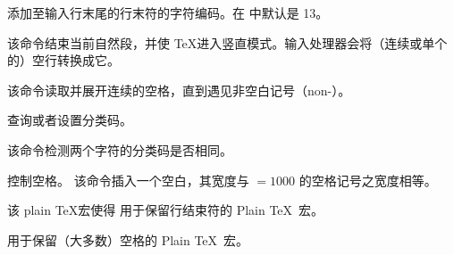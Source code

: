 \documentclass{book}
\begin{document}
\label{cschap:endlinechar}\label{cschap:ignorespaces}\label{cschap:catcode}
\label{cschap:char32}\label{cschap:obeylines}\label{cschap:obeyspaces}
\begin{inventory}
\item [\cs{endlinechar}]
      添加至输入行末尾的行末符的字符编码。在 \IniTeX 中默认是 13。
\item [\cs{par}]
      该命令结束当前自然段，并使 \TeX 进入竖直模式。输入处理器会将（连续或单个的）空行转换成它。

\item [\cs{ignorespaces}]
      该命令读取并展开连续的空格，直到遇见非空白记号（non-）。

\item [\cs{catcode}]
      查询或者设置分类码。

\item [\cs{ifcat}]
      该命令检测两个字符的分类码是否相同。

\item [\cs{\textvisiblespace}]
      控制空格。
      该命令插入一个空白，其宽度与 ${}=1000$ 的空格记号之宽度相等。

\item [\cs{obeylines}]
      该 plain \TeX 宏使得
      用于保留行结束符的 Plain \TeX\ 宏。

\item [\cs{obeyspaces}]
      用于保留（大多数）空格的 Plain \TeX\ 宏。
\end{inventory}
\end{document}
